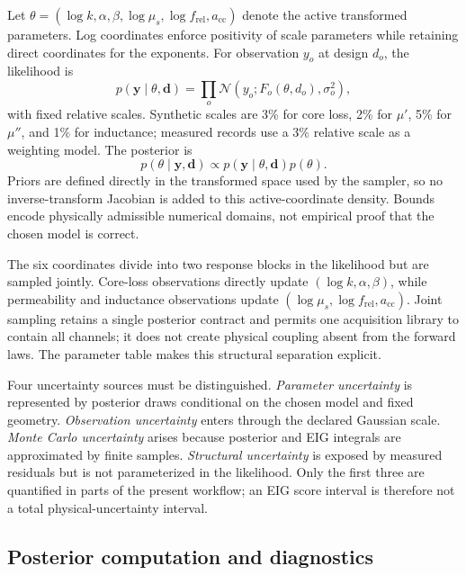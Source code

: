 Let
\(\theta=(\log k,\alpha,\beta,\log\mu_s,\log f_{\mathrm{rel}}, a_{\mathrm{cc}})\)
denote the active transformed parameters. Log coordinates enforce
positivity of scale parameters while retaining direct coordinates for
the exponents. For observation \(y_o\) at design \(d_o\), the likelihood
is \[p(\mathbf y\mid\theta,\mathbf d)=
 \prod_o \mathcal N\!\left(y_o;F_o(\theta,d_o),\sigma_o^2\right),\] with
fixed relative scales. Synthetic scales are 3\% for core loss, 2\% for
\(\mu'\), 5\% for \(\mu''\), and 1\% for inductance; measured records
use a 3\% relative scale as a weighting model. The posterior is
\[p(\theta\mid\mathbf y,\mathbf d)\propto
 p(\mathbf y\mid\theta,\mathbf d)p(\theta).\] Priors are defined
directly in the transformed space used by the sampler, so no
inverse-transform Jacobian is added to this active-coordinate density.
Bounds encode physically admissible numerical domains, not empirical
proof that the chosen model is correct.

The six coordinates divide into two response blocks in the likelihood
but are sampled jointly. Core-loss observations directly update
\((\log k,\alpha,\beta)\), while permeability and inductance
observations update
\((\log\mu_s,\log f_{\mathrm{rel}},a_{\mathrm{cc}})\). Joint sampling
retains a single posterior contract and permits one acquisition library
to contain all channels; it does not create physical coupling absent
from the forward laws. The parameter table makes this structural
separation explicit.

Four uncertainty sources must be distinguished. \emph{Parameter
uncertainty} is represented by posterior draws conditional on the chosen
model and fixed geometry. \emph{Observation uncertainty} enters through
the declared Gaussian scale. \emph{Monte Carlo uncertainty} arises
because posterior and EIG integrals are approximated by finite samples.
\emph{Structural uncertainty} is exposed by measured residuals but is
not parameterized in the likelihood. Only the first three are quantified
in parts of the present workflow; an EIG score interval is therefore not
a total physical-uncertainty interval.

\hypertarget{posterior-computation-and-diagnostics}{%
\subsection{Posterior computation and
diagnostics}\label{posterior-computation-and-diagnostics}}

